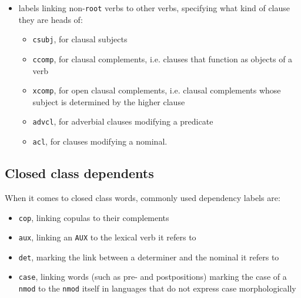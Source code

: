 \begin{itemize}
    \item labels linking non-\texttt{root} verbs to other verbs, specifying what kind of clause they are heads of:
    \begin{itemize}
        \item \texttt{csubj}, for clausal subjects
        \item \texttt{ccomp}, for clausal complements, i.e. clauses that function as objects of a verb
        \item \texttt{xcomp}, for open clausal complements, i.e. clausal complements whose subject is determined by the higher clause
        \item \texttt{advcl}, for adverbial clauses modifying a predicate
        \item \texttt{acl}, for clauses modifying a nominal.
    \end{itemize}
\end{itemize}

\subsection{Closed class dependents}
When it comes to closed class words, commonly used dependency labels are:

\begin{itemize}
    \item \texttt{cop}, linking copulas to their complements
    \item \texttt{aux}, linking an \texttt{AUX} to the lexical verb it refers to
    \item \texttt{det}, marking the link between a determiner and the nominal it refers to
    \item \texttt{case}, linking words (such as pre- and postpositions) marking the case of a \texttt{nmod} to the \texttt{nmod} itself in languages that do not express case morphologically
\end{itemize} 


